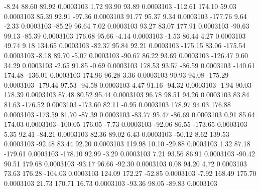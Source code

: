        -8.24       88.60       89.92     0.0003103
        1.72       93.90       93.89     0.0003103
     -112.61      174.10       59.03     0.0003103
       85.39       92.91      -97.36     0.0003103
       91.77       95.37        9.34     0.0003103
     -177.76        9.64       -2.33     0.0003103
      -85.29       96.64        7.02     0.0003103
       93.27       83.07      177.91     0.0003103
      -90.63       99.13      -85.39     0.0003103
      176.68       95.66       -4.14     0.0003103
       -1.53       86.44        4.27     0.0003103
       49.74        9.18      134.65     0.0003103
      -82.37       95.84       92.21     0.0003103
     -175.15       83.06     -175.54     0.0003103
       -8.18       89.70       -5.07     0.0003103
      -90.67       86.22       93.69     0.0003103
     -126.47        9.60       34.29     0.0003103
       -2.65       91.85       -0.69     0.0003103
      178.53       93.57      -86.59     0.0003103
     -140.61      174.48     -136.01     0.0003103
      174.96       96.28        3.36     0.0003103
       90.93       94.08     -175.29     0.0003103
     -179.44       97.53      -94.58     0.0003103
        4.47       91.16      -94.32     0.0003103
       -1.94       90.03      178.39     0.0003103
       87.48       80.52       95.44     0.0003103
       96.78       98.51       94.26     0.0003103
       83.84       81.63     -176.52     0.0003103
     -173.60       82.11       -0.95     0.0003103
      178.97       94.03      176.88     0.0003103
     -173.59       81.70      -87.39     0.0003103
      -83.77       95.47      -86.69     0.0003103
        0.91       85.64      174.03     0.0003103
     -100.05      176.05       -7.73     0.0003103
      -92.06       86.55     -173.65     0.0003103
        5.35       92.41      -84.21     0.0003103
       82.36       89.02        6.43     0.0003103
      -50.12        8.62      139.53     0.0003103
      -92.48       83.44       92.20     0.0003103
      119.98       10.10      -29.88     0.0003103
        1.32       87.18     -179.61     0.0003103
     -178.10       92.99       -3.29     0.0003103
        7.21       93.56       86.91     0.0003103
      -90.42       90.51      179.68     0.0003103
      -93.17       96.66      -92.30     0.0003103
        0.08       94.20        4.72     0.0003103
       73.63      176.28     -104.03     0.0003103
      124.09      172.27      -52.85     0.0003103
       -7.92      168.49      175.70     0.0003103
       21.73      170.71       16.73     0.0003103
      -93.36       98.05      -89.83     0.0003103
